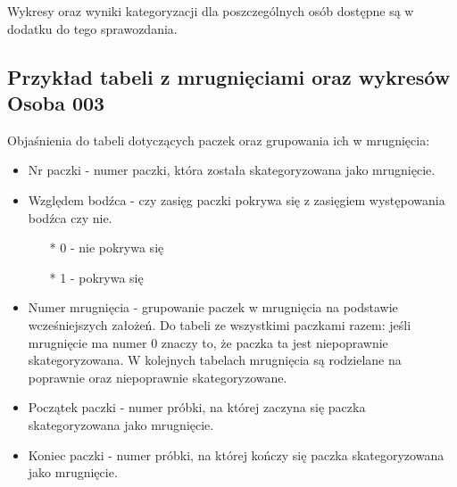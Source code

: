 \documentclass{article}
\begin{document}
    Wykresy oraz wyniki kategoryzacji dla poszczególnych osób dostępne są w dodatku do tego sprawozdania.

    \newpage
    \subsection{Przykład tabeli z mrugnięciami oraz wykresów \\Osoba 003}
        Objaśnienia do tabeli dotyczących paczek oraz grupowania ich w mrugnięcia:\
        \begin{itemize}
            \item Nr paczki - numer paczki, która została skategoryzowana jako mrugnięcie.
            \item Względem bodźca - czy zasięg paczki pokrywa się z zasięgiem występowania bodźca czy nie. 
            \begin{itemize}
                \item[*] 0 - nie pokrywa się\
                \item[*] 1 - pokrywa się\
            \end{itemize}
            \item Numer mrugnięcia - grupowanie paczek w mrugnięcia na podstawie wcześniejszych założeń. Do tabeli ze wszystkimi paczkami razem: jeśli mrugnięcie ma numer 0 znaczy to, że paczka ta jest niepoprawnie skategoryzowana. W kolejnych tabelach mrugnięcia są rodzielane na poprawnie oraz niepoprawnie skategoryzowane.
            \item Początek paczki - numer próbki, na której zaczyna się paczka skategoryzowana jako mrugnięcie.
            \item Koniec paczki - numer próbki, na której kończy się paczka skategoryzowana jako mrugnięcie. 
        \end{itemize}
\end{document}
